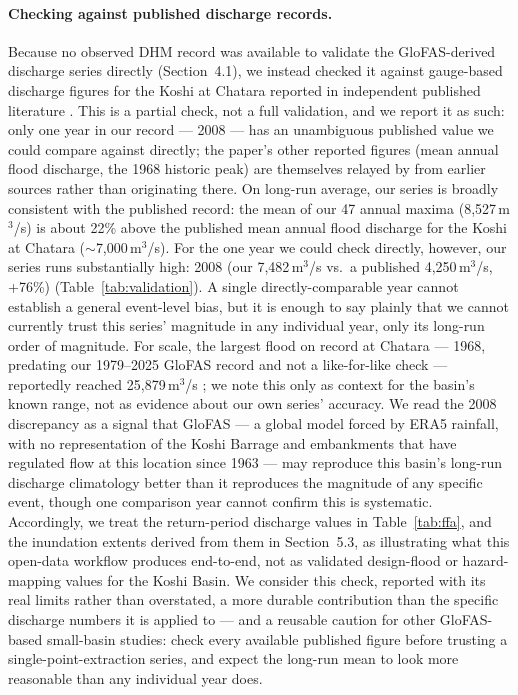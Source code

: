 \documentclass[11pt]{article}
\begin{document}
\paragraph{Checking against published discharge records.} Because no observed DHM record was available to validate the GloFAS-derived discharge series directly (Section~4.1), we instead checked it against gauge-based discharge figures for the Koshi at Chatara reported in independent published literature \citep{devkota2012koshibarrage}. This is a partial check, not a full validation, and we report it as such: only one year in our record --- 2008 --- has an unambiguous published value we could compare against directly; the paper's other reported figures (mean annual flood discharge, the 1968 historic peak) are themselves relayed by \citet{devkota2012koshibarrage} from earlier sources rather than originating there. On long-run average, our series is broadly consistent with the published record: the mean of our 47 annual maxima (8,527\,m$^3$/s) is about 22\% above the published mean annual flood discharge for the Koshi at Chatara (${\sim}$7,000\,m$^3$/s). For the one year we could check directly, however, our series runs substantially high: 2008 (our 7,482\,m$^3$/s vs.\ a published 4,250\,m$^3$/s, +76\%) (Table~\ref{tab:validation}). A single directly-comparable year cannot establish a general event-level bias, but it is enough to say plainly that we cannot currently trust this series' magnitude in any individual year, only its long-run order of magnitude. For scale, the largest flood on record at Chatara --- 1968, predating our 1979--2025 GloFAS record and not a like-for-like check --- reportedly reached 25,879\,m$^3$/s \citep{devkota2012koshibarrage}; we note this only as context for the basin's known range, not as evidence about our own series' accuracy. We read the 2008 discrepancy as a signal that GloFAS --- a global model forced by ERA5 rainfall, with no representation of the Koshi Barrage and embankments that have regulated flow at this location since 1963 --- may reproduce this basin's long-run discharge climatology better than it reproduces the magnitude of any specific event, though one comparison year cannot confirm this is systematic. Accordingly, we treat the return-period discharge values in Table~\ref{tab:ffa}, and the inundation extents derived from them in Section~5.3, as illustrating what this open-data workflow produces end-to-end, not as validated design-flood or hazard-mapping values for the Koshi Basin. We consider this check, reported with its real limits rather than overstated, a more durable contribution than the specific discharge numbers it is applied to --- and a reusable caution for other GloFAS-based small-basin studies: check every available published figure before trusting a single-point-extraction series, and expect the long-run mean to look more reasonable than any individual year does.
\end{document}
